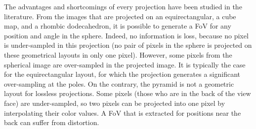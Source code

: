 The advantages and shortcomings of every projection have been studied in the literature. From
the images that are
projected on an equirectangular, a cube map, and a rhombic dodecahedron, it is possible
to generate a \ac{FoV}
for any position and angle in the sphere. Indeed, no information is loss, because no pixel is under-sampled in
this projection (no pair of pixels in the sphere is projected on these geometrical
layouts in only one pixel). However,
some pixels from the spherical image are over-sampled in the projected image. It is typically the case for
the equirectangular layout, for which the projection generates a significant over-sampling at the poles. On the
contrary, the pyramid is not a geometric layout for lossless projections. Some pixels (those who are in the back
of the view face) are under-sampled, so two pixels can be projected into one pixel by interpolating their color
values. A \ac{FoV} that is extracted for positions near the back can suffer from distortion.  